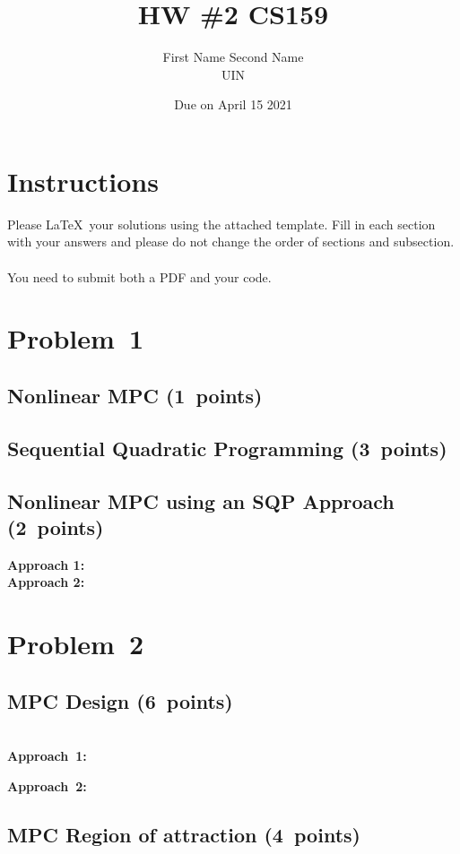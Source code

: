 \documentclass{article}
\title{HW \#2 CS159}
\author{First Name Second Name \\ UIN}
\date{Due on April 15 2021}
\begin{document}
\maketitle

\section*{Instructions}
Please \LaTeX~your solutions using the attached template. Fill in each section with your answers and please do not change the order of sections and subsection. ~\\

\noindent
You need to submit both a PDF and your code. ~\\


\section{Problem~1}

\subsection{Nonlinear MPC (1~points)}

\subsection{Sequential Quadratic Programming (3~points)}


\subsection{Nonlinear MPC using an SQP Approach (2~points)}


\noindent
\textbf{Approach 1:}\\
\textbf{Approach 2:}\\


\section{Problem~2}


\subsection{MPC Design (6~points)}\label{sec:MPCdesign}

~\\
\noindent
\textbf{Approach~1:} 

\noindent
\textbf{Approach~2:} 


\subsection{MPC Region of attraction (4~points)}\label{sec:RegAtt}
\end{document}
